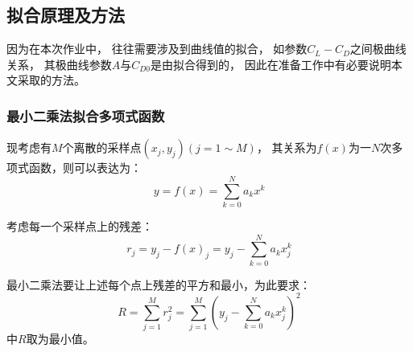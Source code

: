 \begin{figure}[H]
{        \label{密度高度分布}
    }
\end{figure}







\subsection{拟合原理及方法}

因为在本次作业中，
往往需要涉及到曲线值的拟合，
如参数$C_L-C_D$之间极曲线关系，
其极曲线参数$A$与$C_{D0}$是由拟合得到的，
因此在准备工作中有必要说明本文采取的方法。

\subsubsection{最小二乘法拟合多项式函数}

现考虑有$M$个离散的采样点$(x_j,y_j)(j=1\sim M)$，
其关系为$f(x)$为一$N$次多项式函数，则可以表达为：
\begin{equation}
    y = f(x) = \sum_{k=0}^N a_k x^k
\end{equation}

考虑每一个采样点上的残差：
\begin{equation}
    r_j = y_j - f(x)_j = y_j - \sum_{k=0}^N a_k x_j^k
\end{equation}

最小二乘法要让上述每个点上残差的平方和最小，为此要求：
\begin{equation}
    R =\sum_{j=1}^M r_j^2 =\sum_{j=1}^M \left( y_j - \sum_{k=0}^N a_k x_j^k\right)^2
\end{equation}
中$R$取为最小值。

